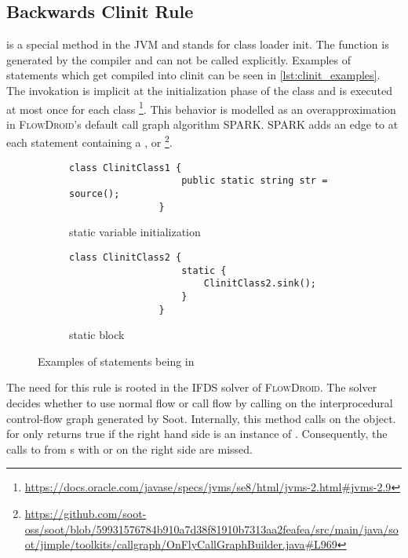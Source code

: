 \documentclass[../draft.tex]{subfiles}
\begin{document}
    \subsection{Backwards Clinit Rule}\label{s:clinitrule}
     is a special method in the JVM and stands for class loader init. The function is generated by the compiler and can not be called explicitly. Examples of statements which get compiled into clinit can be seen in \autoref{lst:clinit_examples}. The invokation is implicit at the initialization phase of the class and is executed at most once for each class \footnote{\url{https://docs.oracle.com/javase/specs/jvms/se8/html/jvms-2.html\#jvms-2.9}}. 
    This behavior is modelled as an overapproximation in \textsc{FlowDroid}'s default call graph algorithm SPARK. SPARK adds an edge to  at each statement containing a ,  or  \footnote{\url{https://github.com/soot-oss/soot/blob/59931576784b910a7d38f81910b7313aa2feafea/src/main/java/soot/jimple/toolkits/callgraph/OnFlyCallGraphBuilder.java\#L969}}.
   
    \begin{figure}[ht]
        \centering
        \begin{subfigure}[b]{0.45\textwidth}
            \centering
            \begin{lstlisting}[gobble=16]
                class ClinitClass1 {
                    public static string str = source();
                }
            \end{lstlisting}
            \caption{static variable initialization}
            \label{lst:clinit_examples_a}
        \end{subfigure}
        \hfill
        \begin{subfigure}[b]{0.45\textwidth}
            \centering
            \begin{lstlisting}[gobble=16]
                class ClinitClass2 {
                    static {
                        ClinitClass2.sink();
                    }
                }
            \end{lstlisting}
            \caption{static block}
            \label{lst:clinit_examples_b}
        \end{subfigure}
        \caption{Examples of statements being in }
        \label{lst:clinit_examples}
    \end{figure}


    The need for this rule is rooted in the IFDS solver of \textsc{FlowDroid}. The solver decides whether to use normal flow or call flow by calling  on the interprocedural control-flow graph generated by Soot. Internally, this method calls  on the  object.  for  only returns true if the right hand side is an instance of . Consequently, the calls to  from s with  or  on the right side are missed.
\end{document}
